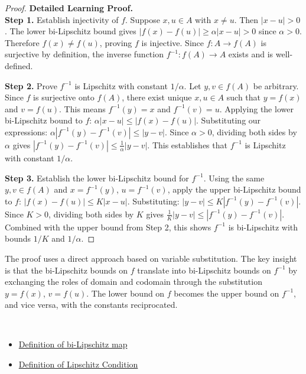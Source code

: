 \begin{proof}
\textbf{Detailed Learning Proof.}~\\

\textbf{Step 1.} Establish injectivity of $f$. Suppose $x, u \in A$ with $x \neq u$. Then $|x - u| > 0$. The lower bi-Lipschitz bound gives $|f(x) - f(u)| \geq \alpha|x - u| > 0$ since $\alpha > 0$. Therefore $f(x) \neq f(u)$, proving $f$ is injective. Since $f : A \to f(A)$ is surjective by definition, the inverse function $f^{-1} : f(A) \to A$ exists and is well-defined.

\textbf{Step 2.} Prove $f^{-1}$ is Lipschitz with constant $1/\alpha$. Let $y, v \in f(A)$ be arbitrary. Since $f$ is surjective onto $f(A)$, there exist unique $x, u \in A$ such that $y = f(x)$ and $v = f(u)$. This means $f^{-1}(y) = x$ and $f^{-1}(v) = u$. Applying the lower bi-Lipschitz bound to $f$: $\alpha|x - u| \leq |f(x) - f(u)|$. Substituting our expressions: $\alpha|f^{-1}(y) - f^{-1}(v)| \leq |y - v|$. Since $\alpha > 0$, dividing both sides by $\alpha$ gives $|f^{-1}(y) - f^{-1}(v)| \leq \frac{1}{\alpha}|y - v|$. This establishes that $f^{-1}$ is Lipschitz with constant $1/\alpha$.

\textbf{Step 3.} Establish the lower bi-Lipschitz bound for $f^{-1}$. Using the same $y, v \in f(A)$ and $x = f^{-1}(y)$, $u = f^{-1}(v)$, apply the upper bi-Lipschitz bound to $f$: $|f(x) - f(u)| \leq K|x - u|$. Substituting: $|y - v| \leq K|f^{-1}(y) - f^{-1}(v)|$. Since $K > 0$, dividing both sides by $K$ gives $\frac{1}{K}|y - v| \leq |f^{-1}(y) - f^{-1}(v)|$. Combined with the upper bound from Step 2, this shows $f^{-1}$ is bi-Lipschitz with bounds $1/K$ and $1/\alpha$.
\end{proof}

\begin{remark*}
The proof uses a direct approach based on variable substitution. The key insight is that the bi-Lipschitz bounds on $f$ translate into bi-Lipschitz bounds on $f^{-1}$ by exchanging the roles of domain and codomain through the substitution $y = f(x)$, $v = f(u)$. The lower bound on $f$ becomes the upper bound on $f^{-1}$, and vice versa, with the constants reciprocated.
\end{remark*}

\begin{remark*}[Dependencies]~\\
\begin{itemize}
  \item \hyperref[def:bi-lipschitz]{Definition of bi-Lipschitz map}
  \item \hyperref[def:lipschitz-condition]{Definition of Lipschitz Condition}
\end{itemize}
\end{remark*}
